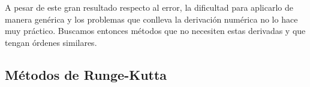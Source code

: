 
A pesar de este gran resultado respecto al error, la dificultad para aplicarlo de manera genérica y los problemas que conlleva la derivación numérica no lo hace muy práctico. Buscamos entonces métodos que no necesiten estas derivadas y que tengan órdenes similares.

\subsection{Métodos de Runge-Kutta}

